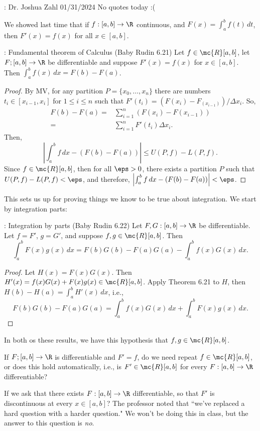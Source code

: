 \begin{nquote}{: Dr. Joshua Zahl 01/31/2024}
	No quotes today :(
\end{nquote}

We showed last time that if \(f:[a,b]\to\R\) continuous, and \(F(x)=\displaystyle\int_a^b f(t) \, dt\), then \(F'(x)=f(x)\) for all \(x\in [a,b]\).

\begin{ntheorem}{: Fundamental theorem of Calculus (Baby Rudin 6.21)}
	Let \(f\in\mc{R}[a,b]\), let \(F;[a,b]\to\R\) be differentiable and suppose \(F'(x)=f(x)\) for \(x\in [a,b]\). Then \(\displaystyle\int_a^b f(x) \, dx=F(b)-F(a)\).
\end{ntheorem} 
\begin{proof}
	By MV, for any partition \(P=\{x_0,\dots,x_n\}\) there are numbers \(t_i\in[x_{i-1},x_i]\) for \(1\leq i\leq n\) such that \(F'(t_i)=(F(x_i)-F_(x_{i-1}))/\Delta x_i\). So, 
	\begin{align*}
		F(b)-F(a)=& \sum_{i=1}^{n}(F(x_i)-F(x_{i-1}))\\
				 =&\sum_{i=1}^n F'(t_i)\Delta x_i.
	\end{align*}
	Then, 
	\begin{equation*}
		\left|\int_a^b f \, dx-(F(b)-F(a))\right|\leq U(P,f)-L(P,f).
	\end{equation*}
	Since \(f\in\mc{R}[a,b]\), then for all \(\eps>0\), there exists a partition \(P\) such that \(U(P,f)-L(P,f)<\eps\), and therefore, \(\left|\int_a^b f \, dx-(F(b)-F(a))\right|<\eps\).
\end{proof}
This sets us up for proving things we know to be true about integration. We start by integration parts:
\begin{ntheorem}{: Integration by parts (Baby Rudin 6.22)}
	Let \(F,G:[a,b]\to\R\) be differentiable. Let \(f=F'\), \(g=G'\), and suppose \(f,g\in\mc{R}[a,b]\). Then 
	\begin{equation*}
		\int_a^b F(x)g(x) \, dx=F(b)G(b)-F(a)G(a)-\int_a^b f(x)G(x) \, dx.
	\end{equation*}
\end{ntheorem}
\begin{proof}
	Let \(H(x)=F(x)G(x)\). Then \(H'(x)=f(x)G(x)+F(x)g(x)\in\mc{R}[a,b]\). Apply Theorem 6.21 to \(H\), then \(H(b)-H(a)=\displaystyle\int_a^b H'(x) \, dx\), i.e., 
	\begin{equation*}
		F(b)G(b)-F(a)G(a)=\int_a^b f(x)G(x) \, dx+\int_a^b F(x)g(x) \, dx.
	\end{equation*}
\end{proof}
In both os these results, we have this hypothesis that \(f,g\in\mc{R}[a,b]\). 
\begin{fft}
	If \(F;[a,b]\to\R\) is differentiable and \(F'=f\), do we need repeat \(f\in\mc{R}[a,b]\), or does this hold automatically, i.e., is \(F'\in\mc{R}[a,b]\) for every \(F:[a,b]\to\R\) differentiable?
\end{fft}
If we ask that there exists \(F:[a,b]\to\R\) differentiable, so that \(F'\) is discontinuous at every \(x\in[a,b]\)? The professor noted that ``we've replaced a hard question with a harder question." We won't be doing this in class, but the answer to this question is \emph{no}.

